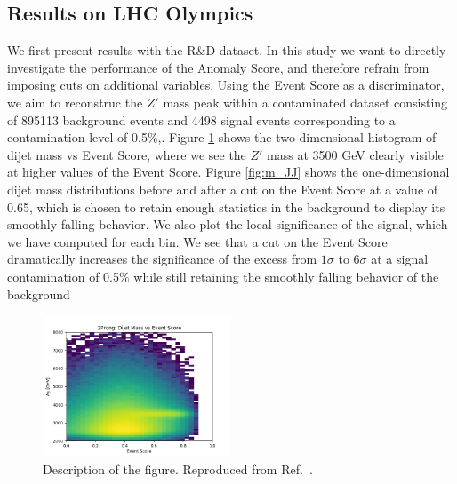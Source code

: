 \documentclass[letterpaper,11pt]{article}
\begin{document}
\subsection{Results on LHC Olympics}
\label{sec:results}


We first present results with the R\&D dataset. In this study we want to directly investigate the performance of the Anomaly Score, and therefore refrain from imposing cuts on additional variables. Using the Event Score as a discriminator, we aim to reconstruc the $Z'$ mass peak within a contaminated dataset consisting of 895113 background events and 4498 signal events corresponding to a contamination level of 0.5\%,. Figure \ref{fig:m_v_s} shows the two-dimensional histogram of dijet mass vs Event Score, where we see the $Z'$ mass at 3500 GeV clearly visible at higher values of the Event Score. Figure \ref{fig:m_JJ} shows the one-dimensional dijet mass distributions before and after a cut on the Event Score at a value of 0.65, which is chosen to retain enough statistics in the background to display its smoothly falling behavior. We also plot the local significance of the signal, which we have computed for each bin. We see that a cut on the Event Score dramatically increases the significance of the excess from $1\sigma$ to $6\sigma$ at a signal contamination of 0.5\% while still retaining the smoothly falling behavior of the background

\begin{figure}[h!]
\centering
\includegraphics[width=0.5\textwidth]{imgs/ProcR_2Prong_Contaminated_10p0_2Prong_Contaminated_10p0_Weights_Event_ConstOnly_Avg_JJ_M_vs_Event_Score.png}
\caption{Description of the figure.  Reproduced from Ref.~\cite{Nachman:2020lpy}.}
\label{fig:m_v_s}
\end{figure}
\end{document}
